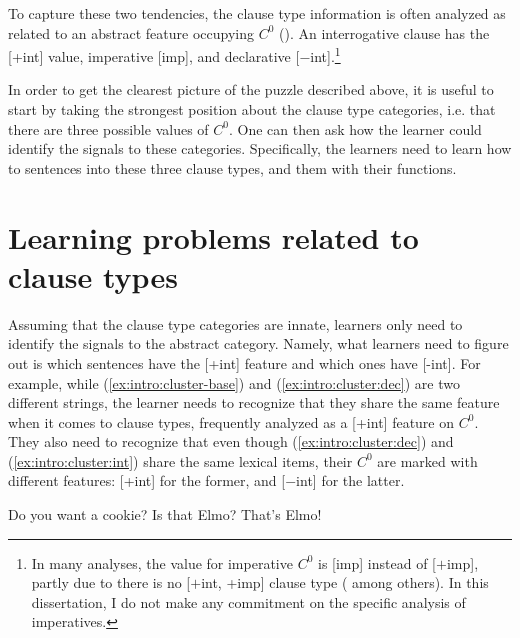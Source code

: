 To capture these two tendencies, the clause type information is often analyzed as related to an abstract feature occupying $C^{0}$ (\cite{chomsky1995minimalist, cheng1991, rizzi1997, rizzi2001int, chomskylasnik1977,platzack1997imp,akmajian1984clausetype, han1998imp}). An interrogative clause has the [+int] value, imperative [imp], and declarative [$-$int].\footnote{In many analyses, the value for imperative $C^{0}$ is [imp] instead of [$+$imp], partly due to there is no [$+$int, +imp] clause type (\cite{platzack1997imp,han1998imp} among others). In this dissertation, I do not make any commitment on the specific analysis of imperatives.} 




In order to get the clearest picture of the puzzle described above, it is useful to
start by taking the strongest position about the clause type categories, i.e. that there are three possible values of $C^{0}$. One can then ask how the learner could identify the signals to these categories. Specifically, the learners need to learn how to  sentences into these three clause types, and  them with their functions. 

\section{Learning problems related to clause types}
Assuming that the clause type categories are innate, learners only need to identify the signals to the abstract category. Namely, what learners need to figure out is which sentences have the [+int] feature and which ones have [-int]. 
For example, while (\ref{ex:intro:cluster-base}) and (\ref{ex:intro:cluster:dec}) are two different strings, the learner needs to recognize that they share the same feature when it comes to clause types, frequently analyzed as a [+int] feature on $C^{0}$. They also need to recognize that even though (\ref{ex:intro:cluster:dec}) and (\ref{ex:intro:cluster:int}) share the same lexical items, their $C^{0}$ are marked with different features: [+int] for the former, and [$-$int] for the latter.


Do you want a cookie?
\eex
{}
\bxl\label{ex:intro:cluster:int}
Is that Elmo?
\ex\label{ex:intro:cluster:dec}
That’s Elmo!
\exl
\eex


